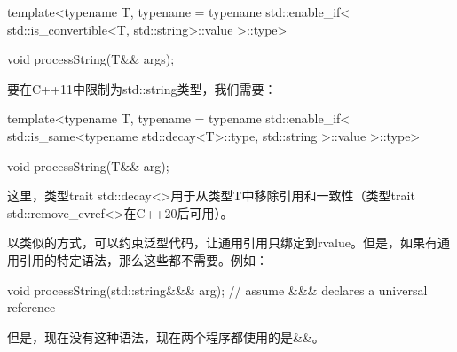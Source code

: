 \begin{cppcode}
template<typename T,
typename = typename std::enable_if<
std::is_convertible<T, std::string>::value
>::type>

void processString(T&& args);
\end{cppcode}

要在C++11中限制为std::string类型，我们需要：

\begin{cppcode}
template<typename T,
typename = typename std::enable_if<
std::is_same<typename std::decay<T>::type,
				std::string
			>::value
		>::type>

void processString(T&& arg);
\end{cppcode}

这里，类型trait std::decay<>用于从类型T中移除引用和一致性（类型trait std::remove_cvref<>在C++20后可用）。

以类似的方式，可以约束泛型代码，让通用引用只绑定到rvalue。但是，如果有通用引用的特定语法，那么这些都不需要。例如：

\begin{cppcode}
void processString(std::string&&& arg); // assume &&& declares a universal reference
\end{cppcode}

但是，现在没有这种语法，现在两个程序都使用的是\&\&。




























